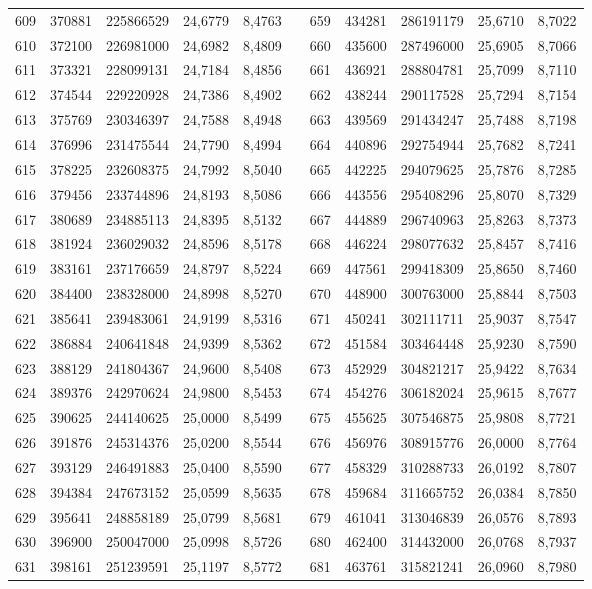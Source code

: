 \begin{longtable}{rrrrrrrrrrr}
609&370881&225866529&24,6779&8,4763&&659&434281&286191179&25,6710&8,7022\\
610&372100&226981000&24,6982&8,4809&&660&435600&287496000&25,6905&8,7066\\
611&373321&228099131&24,7184&8,4856&&661&436921&288804781&25,7099&8,7110\\
612&374544&229220928&24,7386&8,4902&&662&438244&290117528&25,7294&8,7154\\
613&375769&230346397&24,7588&8,4948&&663&439569&291434247&25,7488&8,7198\\
614&376996&231475544&24,7790&8,4994&&664&440896&292754944&25,7682&8,7241\\
615&378225&232608375&24,7992&8,5040&&665&442225&294079625&25,7876&8,7285\\
616&379456&233744896&24,8193&8,5086&&666&443556&295408296&25,8070&8,7329\\
617&380689&234885113&24,8395&8,5132&&667&444889&296740963&25,8263&8,7373\\
618&381924&236029032&24,8596&8,5178&&668&446224&298077632&25,8457&8,7416\\
619&383161&237176659&24,8797&8,5224&&669&447561&299418309&25,8650&8,7460\\
620&384400&238328000&24,8998&8,5270&&670&448900&300763000&25,8844&8,7503\\
621&385641&239483061&24,9199&8,5316&&671&450241&302111711&25,9037&8,7547\\
622&386884&240641848&24,9399&8,5362&&672&451584&303464448&25,9230&8,7590\\
623&388129&241804367&24,9600&8,5408&&673&452929&304821217&25,9422&8,7634\\
624&389376&242970624&24,9800&8,5453&&674&454276&306182024&25,9615&8,7677\\
625&390625&244140625&25,0000&8,5499&&675&455625&307546875&25,9808&8,7721\\
626&391876&245314376&25,0200&8,5544&&676&456976&308915776&26,0000&8,7764\\
627&393129&246491883&25,0400&8,5590&&677&458329&310288733&26,0192&8,7807\\
628&394384&247673152&25,0599&8,5635&&678&459684&311665752&26,0384&8,7850\\
629&395641&248858189&25,0799&8,5681&&679&461041&313046839&26,0576&8,7893\\
630&396900&250047000&25,0998&8,5726&&680&462400&314432000&26,0768&8,7937\\
631&398161&251239591&25,1197&8,5772&&681&463761&315821241&26,0960&8,7980\\

\end{longtable}
